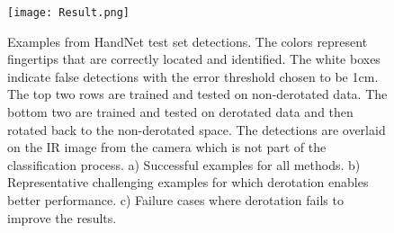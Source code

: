 \documentclass{bmvc2k}
\begin{document}
\begin{figure}[t]
\begin{center}
\texttt{[image: Result.png]}
\end{center}
   \caption{\scriptsize \color{blue} Examples from HandNet test set detections. The colors represent 
   fingertips that are correctly located and identified. The white boxes indicate false 
   detections with the error threshold chosen to be 1cm. The top two rows are trained and tested on 
   non-derotated data. The bottom two are trained and tested on derotated data and then rotated back 
   to the non-derotated space. The detections are overlaid on the IR image from the 
   camera which is not part of the classification process. a) Successful examples for all methods. 
   b) Representative challenging examples for which derotation enables better performance. 
   c) Failure cases where derotation fails to improve the results.}
   
\label{fig:fingertips}
\end{figure}
\end{document}
